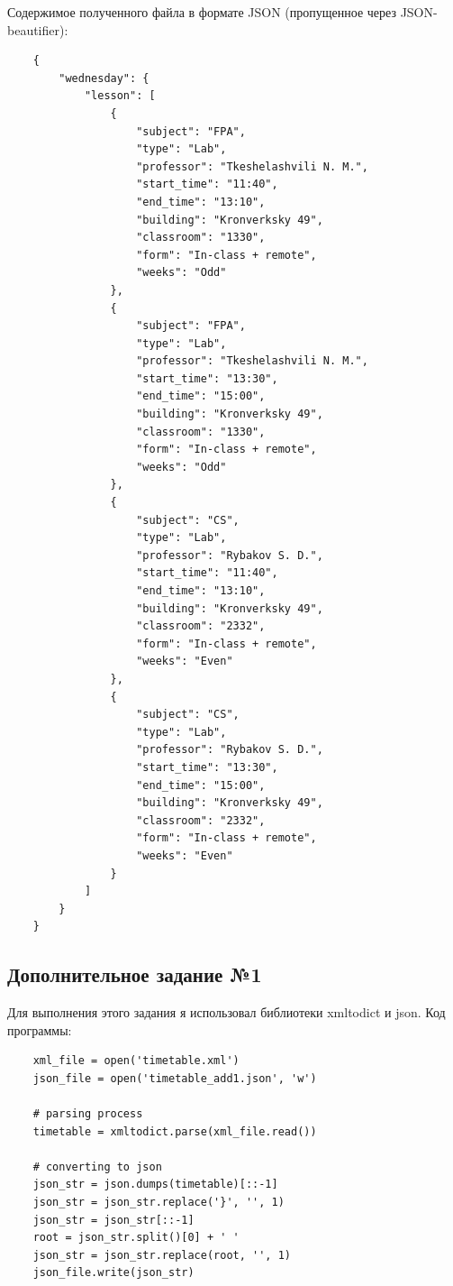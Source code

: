 \documentclass[12pt]{article}
\begin{document}
\newpage

Содержимое полученного файла в формате JSON (пропущенное через JSON-beautifier):

\begin{verbatim}
    {
        "wednesday": {
            "lesson": [
                {
                    "subject": "FPA",
                    "type": "Lab",
                    "professor": "Tkeshelashvili N. M.",
                    "start_time": "11:40",
                    "end_time": "13:10",
                    "building": "Kronverksky 49",
                    "classroom": "1330",
                    "form": "In-class + remote",
                    "weeks": "Odd"
                },
                {
                    "subject": "FPA",
                    "type": "Lab",
                    "professor": "Tkeshelashvili N. M.",
                    "start_time": "13:30",
                    "end_time": "15:00",
                    "building": "Kronverksky 49",
                    "classroom": "1330",
                    "form": "In-class + remote",
                    "weeks": "Odd"
                },
                {
                    "subject": "CS",
                    "type": "Lab",
                    "professor": "Rybakov S. D.",
                    "start_time": "11:40",
                    "end_time": "13:10",
                    "building": "Kronverksky 49",
                    "classroom": "2332",
                    "form": "In-class + remote",
                    "weeks": "Even"
                },
                {
                    "subject": "CS",
                    "type": "Lab",
                    "professor": "Rybakov S. D.",
                    "start_time": "13:30",
                    "end_time": "15:00",
                    "building": "Kronverksky 49",
                    "classroom": "2332",
                    "form": "In-class + remote",
                    "weeks": "Even"
                }
            ]
        }
    }
\end{verbatim}

\newpage

\subsection{Дополнительное задание №1}

Для выполнения этого задания я использовал библиотеки xmltodict и json. Код программы:

\begin{verbatim}
    xml_file = open('timetable.xml')
    json_file = open('timetable_add1.json', 'w')
    
    # parsing process
    timetable = xmltodict.parse(xml_file.read())
    
    # converting to json
    json_str = json.dumps(timetable)[::-1]
    json_str = json_str.replace('}', '', 1)
    json_str = json_str[::-1]
    root = json_str.split()[0] + ' '
    json_str = json_str.replace(root, '', 1)
    json_file.write(json_str)
\end{verbatim}
\end{document}
